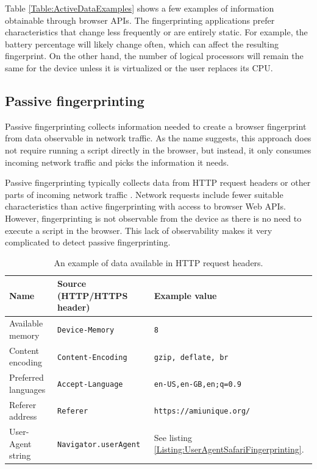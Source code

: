 Table \ref{Table:ActiveDataExamples} shows a few examples of information obtainable through browser APIs. The fingerprinting applications prefer characteristics that change less frequently or are entirely static. For example, the battery percentage will likely change often, which can affect the resulting fingerprint. On the other hand, the number of logical processors will remain the same for the device unless it is virtualized or the user replaces its CPU.

\subsection{Passive fingerprinting}

Passive fingerprinting collects information needed to create a browser fingerprint from data observable in network traffic. As the name suggests, this approach does not require running a script directly in the browser, but instead, it only consumes incoming network traffic and picks the information it needs.

Passive fingerprinting typically collects data from HTTP request headers or other parts of incoming network traffic \cite{JShelterPaper}. Network requests include fewer suitable characteristics than active fingerprinting with access to browser Web APIs. However, fingerprinting is not observable from the device as there is no need to execute a script in the browser. This lack of observability makes it very complicated to detect passive fingerprinting.

\begin{table}[H]
	\centering
	\begin{tabular}{lll}
		\toprule
		Name                & Source (HTTP/HTTPS header)   & Example value \\
		\midrule
		Available memory    & \texttt{Device-Memory}       & \verb|8| \\
		Content encoding    & \texttt{Content-Encoding}    & \verb|gzip, deflate, br| \\
		Preferred languages & \texttt{Accept-Language}     & \verb|en-US,en-GB,en;q=0.9| \\
		Referer address     & \texttt{Referer}             & \verb|https://amiunique.org/| \\
		User-Agent string   & \texttt{Navigator.userAgent} & See listing \ref{Listing:UserAgentSafariFingerprinting}. \\
		\bottomrule                               
	\end{tabular}
	
	\caption{An example of data available in HTTP request headers.}
	\label{Table:PassiveDataExamples}
\end{table}

